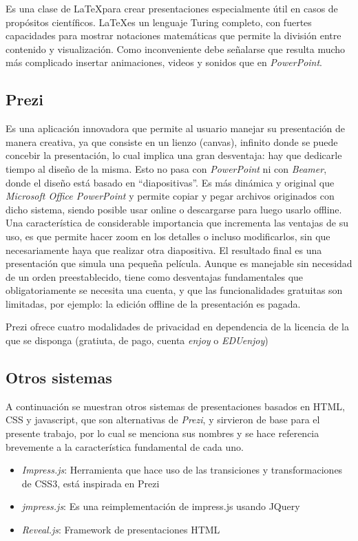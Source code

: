 			Es una clase de \LaTeX para crear presentaciones especialmente útil en casos de propósitos científicos. \LaTeX es un lenguaje Turing completo, con fuertes capacidades para mostrar notaciones matemáticas que permite la división entre contenido y visualización. Como inconveniente debe señalarse que resulta mucho más complicado insertar animaciones, videos y sonidos que en \textit{PowerPoint}.	


		\subsection{Prezi} %
		\label{sub:prezi}

			Es una aplicación innovadora que permite al usuario manejar su presentación de manera creativa, ya que consiste en un lienzo (canvas), infinito donde se puede concebir la presentación, lo cual implica una gran desventaja: hay que dedicarle tiempo al diseño de la misma. Esto no pasa con \textit{PowerPoint} ni con \textit{Beamer}, donde el diseño está basado en ``diapositivas''. Es más dinámica y original que \textit{Microsoft Office PowerPoint} y permite copiar y pegar archivos originados con dicho sistema, siendo posible usar online o descargarse para luego usarlo offline.  Una característica de considerable importancia que incrementa las ventajas de su uso, es que permite hacer zoom en los detalles o incluso modificarlos, sin que necesariamente haya que realizar otra diapositiva. El resultado final es una presentación que simula una pequeña película. Aunque es manejable sin necesidad de un orden preestablecido, tiene como desventajas fundamentales que obligatoriamente se necesita una cuenta, y que las funcionalidades gratuitas son limitadas, por ejemplo: la edición offline de la presentación es pagada.

			Prezi ofrece cuatro modalidades de privacidad en dependencia de la licencia de la que se disponga (gratiuta, de pago, cuenta \textit{enjoy} o \textit{EDUenjoy})		


		\subsection{Otros sistemas} %
		\label{sub:otros_sistemas}
			A continuación se muestran otros sistemas de presentaciones basados en HTML, CSS y javascript, que son alternativas de \textit{Prezi}, y sirvieron de base para el presente trabajo, por lo cual se menciona sus nombres y se hace referencia brevemente a la característica fundamental de cada uno.
			\begin{itemize}
				\item \textit{Impress.js}: Herramienta que hace uso de las transiciones y transformaciones de CSS3, está inspirada en Prezi
				\item \textit{jmpress.js}: Es una reimplementación de impress.js usando JQuery
				\item \textit{Reveal.js}: Framework de presentaciones HTML
			\end{itemize}
	

